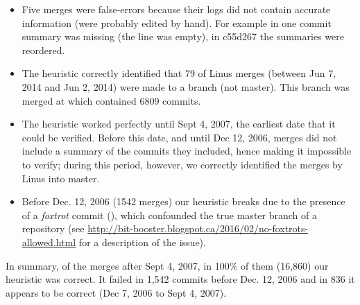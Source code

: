 \begin{itemize}
\item Five merges were false-errors because their logs did not contain accurate information (were probably edited by
  hand). For example in  one commit summary was missing (the line was empty), in \mycode
  {c55d267} the summaries were reordered.
\item The heuristic correctly identified that 79 of Linus merges (between Jun 7, 2014 and Jun 2, 2014) were made to a
  branch (not master). This branch was merged at  which contained 6809 commits.
\item The heuristic worked perfectly until Sept 4, 2007, the earliest date that it could be verified.
  Before this date, and until Dec 12, 2006, merges did not include a summary of the commits they included, hence making it
  impossible to verify; during this period, however, we correctly identified the merges by Linus into master.
\item Before Dec. 12, 2006 (1542 merges) our heuristic breaks due to the
presence of a \textit{foxtrot} commit (), which confounded the true master branch of a
repository (see \url{http://bit-booster.blogspot.ca/2016/02/no-foxtrots-allowed.html} for a description of the issue).
\end{itemize}

In summary, of the merges after Sept 4, 2007, in 100\% of them (16,860)
our heuristic was correct. It failed in 1,542 commits before Dec. 12,
2006 and in 836 it appears to be correct (Dec 7, 2006 to Sept 4, 2007).

